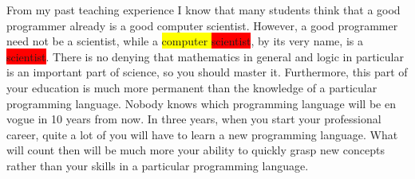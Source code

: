 
From my past teaching experience I know that many students think that a good programmer already is a
good computer scientist.  However, a good programmer need not be a scientist, while a 
\colorbox{yellow}{computer \colorbox{red}{scientist}}, by its very name, is a
\colorbox{red}{scientist}.  There is no denying that mathematics in general and 
logic in particular is an important part of science, so you should master it.  Furthermore, this
part of your education is much more permanent than the knowledge of a particular programming
language.  Nobody knows which programming language will be en vogue in 10 years from now.  In three
years, when you start your professional career, quite a lot of you will have to learn a new
programming language.  What will count then will be much more your ability to quickly grasp new
concepts rather than your skills in a particular programming language.

